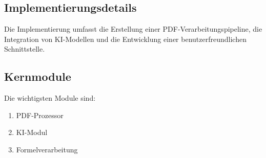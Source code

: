 \subsection{Implementierungsdetails}
Die Implementierung umfasst die Erstellung einer PDF-Verarbeitungspipeline, die Integration von KI-Modellen und die Entwicklung einer benutzerfreundlichen Schnittstelle.

\subsection{Kernmodule}
Die wichtigsten Module sind:
\begin{enumerate}
    \item PDF-Prozessor
    \item KI-Modul
    \item Formelverarbeitung
\end{enumerate}
